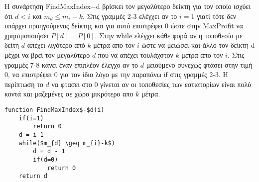 \documentclass[a4paper]{article}
\begin{document}
Η συνάρτηση FindMaxIndex$-$d βρίσκει τον μεγαλύτερο δείκτη για τον οποίο ισχύει ότι $d<i$ και $m_{d} \leq m_{i}-k$. Στις γραμμές 2-3 ελέγχει αν το $i=1$ γιατί τότε δεν υπάρχει προηγούμενος δείκτης και για αυτό επιστρέφει $0$ ώστε στην MaxProfit να χρησιμοποιήσει $P[d]=P[0]$. Στην while ελέγχει κάθε φορά αν η τοποθεσία με δείτη $d$ απέχει λιγότερο από $k$ μέτρα απο τον $i$ ώστε να μειώσει και άλλο τον δείκτη d μέχρι να βρεί τον μεγαλύτερο $d$ που να απέχει τουλάχστον $k$ μετρα απο τον $i$. Στις γραμμές 7-8 κάνει έναν επιπλέον έλεγχο αν το $d$ μειούμενο συνεχώς φτάσει στην τιμή $0$, να επιστρέψει 
$0$ για τον ίδιο λόγο με την παραπάνω if στις γραμμές 2-3. Η περίπτωση το $d$ να φτασει στο $0$ γίνεται αν οι τοποθεσίες των εστιατορίων είναι πολύ κοντά και μαζεμένες σε χώρο μικρότερο απο $k$ μέτρα.

\begin{lstlisting}[mathescape]
function FindMaxIndex$-$d(i)
	if(i=1)
		return 0
	d = i-1
	while($m_{d} \geq m_{i}-k$)
		d = d - 1
		if(d=0)
			return 0
	return d
\end{lstlisting}
\end{document}
